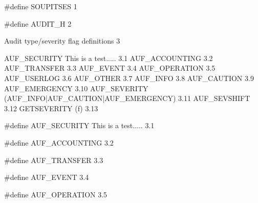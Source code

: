 \documentclass{article}
\begin{document}
\begin{cxxentry}
{\#define}
        {SOUPITSES }
        {}
        {}
        {1}
\end{cxxentry}
\begin{cxxmacro}
{\#define}
        {AUDIT\_H}
        {}
        {}
        {2}
\end{cxxmacro}
\begin{cxxentry}
{}
        {Audit type/severity flag definitions }
        {}
        {}
        {3}
\begin{cxxnames}
        {AUF\_SECURITY}
        {}
        {This is a test..... }
        {3.1}
        {AUF\_ACCOUNTING}
        {}
        {}
        {3.2}
        {AUF\_TRANSFER}
        {}
        {}
        {3.3}
        {AUF\_EVENT}
        {}
        {}
        {3.4}
        {AUF\_OPERATION}
        {}
        {}
        {3.5}
        {AUF\_USERLOG}
        {}
        {}
        {3.6}
        {AUF\_OTHER}
        {}
        {}
        {3.7}
        {AUF\_INFO}
        {}
        {}
        {3.8}
        {AUF\_CAUTION}
        {}
        {}
        {3.9}
        {AUF\_EMERGENCY}
        {}
        {}
        {3.10}
        {AUF\_SEVERITY}
        {(AUF\_INFO|AUF\_CAUTION|AUF\_EMERGENCY)}
        {}
        {3.11}
        {AUF\_SEVSHIFT}
        {}
        {}
        {3.12}
        {GETSEVERITY}
        {(f)}
        {}
        {3.13}
\end{cxxnames}
\begin{cxxmacro}
{\#define}
        {AUF\_SECURITY}
        {}
        {This is a test..... }
        {3.1}
\end{cxxmacro}
\begin{cxxmacro}
{\#define}
        {AUF\_ACCOUNTING}
        {}
        {}
        {3.2}
\end{cxxmacro}
\begin{cxxmacro}
{\#define}
        {AUF\_TRANSFER}
        {}
        {}
        {3.3}
\end{cxxmacro}
\begin{cxxmacro}
{\#define}
        {AUF\_EVENT}
        {}
        {}
        {3.4}
\end{cxxmacro}
\begin{cxxmacro}
{\#define}
        {AUF\_OPERATION}
        {}
        {}
        {3.5}
\end{cxxmacro}

\end{cxxentry}
\end{document}
